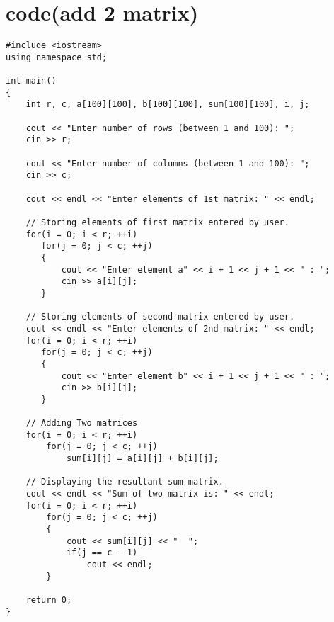\documentclass[12pt]{article}
\begin{document}
\section{code(add 2 matrix)}
\begin{lstlisting}
#include <iostream>
using namespace std;

int main()
{
    int r, c, a[100][100], b[100][100], sum[100][100], i, j;

    cout << "Enter number of rows (between 1 and 100): ";
    cin >> r;

    cout << "Enter number of columns (between 1 and 100): ";
    cin >> c;

    cout << endl << "Enter elements of 1st matrix: " << endl;

    // Storing elements of first matrix entered by user.
    for(i = 0; i < r; ++i)
       for(j = 0; j < c; ++j)
       {
           cout << "Enter element a" << i + 1 << j + 1 << " : ";
           cin >> a[i][j];
       }

    // Storing elements of second matrix entered by user.
    cout << endl << "Enter elements of 2nd matrix: " << endl;
    for(i = 0; i < r; ++i)
       for(j = 0; j < c; ++j)
       {
           cout << "Enter element b" << i + 1 << j + 1 << " : ";
           cin >> b[i][j];
       }

    // Adding Two matrices
    for(i = 0; i < r; ++i)
        for(j = 0; j < c; ++j)
            sum[i][j] = a[i][j] + b[i][j];

    // Displaying the resultant sum matrix.
    cout << endl << "Sum of two matrix is: " << endl;
    for(i = 0; i < r; ++i)
        for(j = 0; j < c; ++j)
        {
            cout << sum[i][j] << "  ";
            if(j == c - 1)
                cout << endl;
        }

    return 0;
}


\end{lstlisting}
\end{document}
